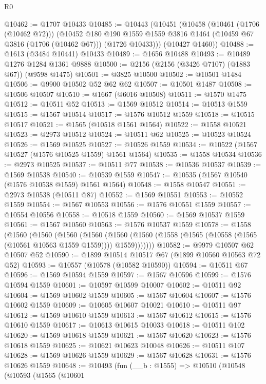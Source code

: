 \begin{lexlean}{R0}
\begin{coremodule}
@10462 := @1707 @10433
@10485 := @10443
    (@10451
      (@10458
        (@10461 (@1706 (@10462 @72)))
        (@10452
          @180
          @190
          @1559
          @1559
          @3816
          @1464
          (@10459 @67 @3816 (@1706 (@10462 @67)))
          (@1726 @10433)))
      (@10427 @1460))
@10488 := @1613 (@3484 @10441) @10433
@10489 := @1656 @10488
@10493 := @10489 @1276 @1284 @1361 @9888
@10500 := @2156 (@2156 (@3426 @7107) (@1883 @67)) (@9598 @1475)
@10501 := @3825 @10500
@10502 := @10501 @1484
@10506 := @9900 @10502 @52 @62 @62
@10507 := @10501 @1487
@10508 := @10506 @10507
@10510 := @1667 (@6016 @10508)
@10511 := @1570 @1475
@10512 := @10511 @52
@10513 := @1569 @10512
@10514 := @10513 @1559
@10515 := @1567 @10514
@10517 := @1576 @10512 @1559
@10518 := @10515 @10517
@10521 := @1565 (@10518 @1561 @1564)
@10522 := @1558 @10521
@10523 := @2973 @10512
@10524 := @10511 @62
@10525 := @10523 @10524
@10526 := @1569 @10525
@10527 := @10526 @1559
@10534 := @10522 (@1567 @10527 (@1576 @10525 @1559) @1561 @1564)
@10535 := @1558 @10534
@10536 := @2973 @10525
@10537 := @10511 @77
@10538 := @10536 @10537
@10539 := @1569 @10538
@10540 := @10539 @1559
@10547 := @10535 (@1567 @10540 (@1576 @10538 @1559) @1561 @1564)
@10548 := @1558 @10547
@10551 := @2973 @10538 (@10511 @87)
@10552 := @1569 @10551
@10553 := @10552 @1559
@10554 := @1567 @10553
@10556 := @1576 @10551 @1559
@10557 := @10554 @10556
@10558 := @10518 @1559
@10560 := @1569 @10537 @1559
@10561 := @1567 @10560
@10563 := @1576 @10537 @1559
@10578 := @1558
    (@1560
      (@1560
        (@1560
          (@1560
            (@1560 (@1560 (@1558 (@1565 (@10558 (@1565 (@10561 @10563 @1559 @1559)))) @1559)))))))
@10582 := @9979 @10507 @62 @10507 @52
@10590 := @1899 @10514 @10517 @67 (@1899 @10560 @10563 @72 @52)
@10593 := @10557 (@10578 (@10582 @10590))
@10594 := @10511 @67
@10596 := @1569 @10594 @1559
@10597 := @1567 @10596
@10599 := @1576 @10594 @1559
@10601 := @10597 @10599 @10007
@10602 := @10511 @92
@10604 := @1569 @10602 @1559
@10605 := @1567 @10604
@10607 := @1576 @10602 @1559
@10609 := @10605 @10607 @10021
@10610 := @10511 @97
@10612 := @1569 @10610 @1559
@10613 := @1567 @10612
@10615 := @1576 @10610 @1559
@10617 := @10613 @10615 @10033
@10618 := @10511 @102
@10620 := @1569 @10618 @1559
@10621 := @1567 @10620
@10623 := @1576 @10618 @1559
@10625 := @10621 @10623 @10048
@10626 := @10511 @107
@10628 := @1569 @10626 @1559
@10629 := @1567 @10628
@10631 := @1576 @10626 @1559
@10648 := @10493
    (fun (__b : @1555) =>
    @10510
      (@10548
        (@10593
          (@1565
            (@10601

\end{coremodule}
\end{lexlean}
